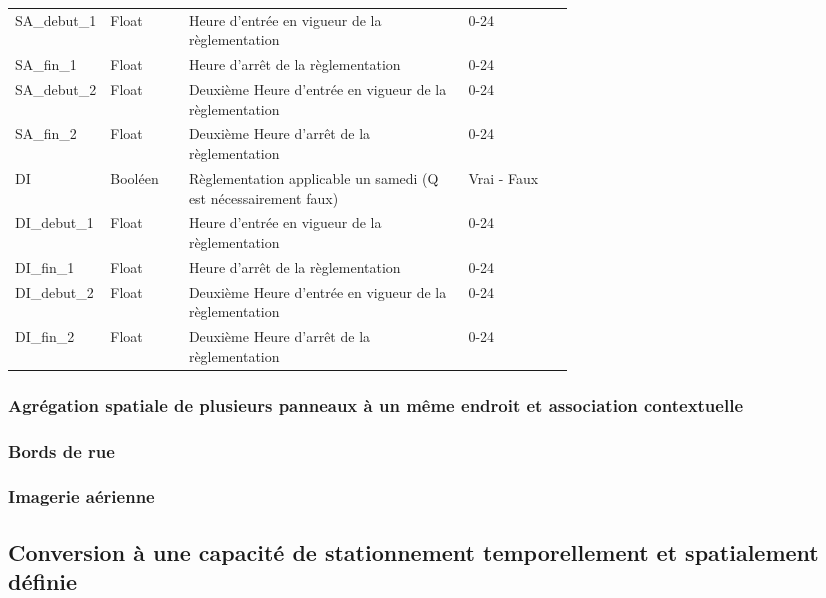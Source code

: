 \begin{longtable}{p{0.15 \linewidth}  l p{0.5\linewidth} l  }
          SA\_debut\_1 & Float & Heure d'entrée en vigueur de la règlementation & 0-24\\
          SA\_fin\_1 & Float & Heure d'arrêt de la règlementation & 0-24\\
          SA\_debut\_2 & Float & Deuxième Heure d'entrée en vigueur de la règlementation & 0-24\\
          SA\_fin\_2 & Float & Deuxième Heure d'arrêt de la règlementation & 0-24 \\
          DI & Booléen & Règlementation applicable un samedi (Q est nécessairement faux) & Vrai - Faux \\
          DI\_debut\_1 & Float & Heure d'entrée en vigueur de la règlementation & 0-24\\
          DI\_fin\_1 & Float & Heure d'arrêt de la règlementation & 0-24\\
          DI\_debut\_2 & Float & Deuxième Heure d'entrée en vigueur de la règlementation & 0-24\\
          DI\_fin\_2 & Float & Deuxième Heure d'arrêt de la règlementation & 0-24 \\  
        \end{longtable}

      \FloatBarrier
      \subsubsection{Agrégation spatiale de plusieurs panneaux à un même endroit et association contextuelle}
    \subsubsection{Bords de rue}
    \subsubsection{Imagerie aérienne}
  \subsection{Conversion à une capacité de stationnement temporellement et spatialement définie}
